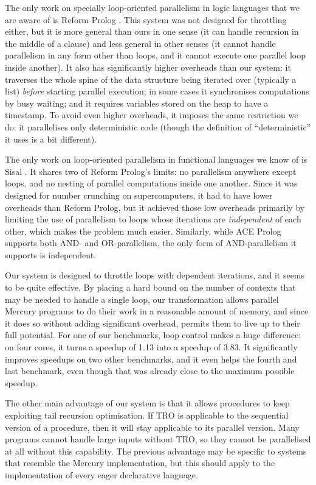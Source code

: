 The only work on specially loop-oriented parallelism in logic languages
that we are aware of is Reform Prolog \citep{bevemyr:reform}.
This system was not designed for throttling either,
but it is more general than ours in one sense
(it can handle recursion in the middle of a clause)
and less general in other senses
(it cannot handle parallelism in any form other than loops,
and it cannot execute one parallel loop inside another).
It also has significantly higher overheads than our system:
it traverses the whole spine of the data structure being iterated over
(typically a list) \emph{before} starting parallel execution;
in some cases it synchronises computations by busy waiting;
and it requires variables stored on the heap to have a timestamp.
To avoid even higher overheads,
it imposes the same restriction we do:
it parallelises only deterministic code
(though the definition of ``deterministic'' it uses is a bit different).

The only work on loop-oriented parallelism in functional languages
we know of is Sisal \citep{feo:1990:sisal-report}.
It shares two of Reform Prolog's limits:
no parallelism anywhere except loops, and
no nesting of parallel computations inside one another.
Since it was designed for number crunching on supercomputers,
it had to have lower overheads than Reform Prolog,
but it achieved those low overheads
primarily by limiting the use of parallelism
to loops whose iterations are \emph{independent} of each other,
which makes the problem much easier.
Similarly, while ACE Prolog supports both AND- and OR-parallelism,
the only form of AND-parallelism it supports is independent.

Our system is designed to throttle loops with dependent iterations,
and it seems to be quite effective.
By placing a hard bound on the number of contexts
that may be needed to handle a single loop,
our transformation allows parallel Mercury programs
to do their work in a reasonable amount of memory,
and since it does so without adding significant overhead,
permits them to live up to their full potential.
For one of our benchmarks,
loop control makes a huge difference:
on four cores, it turns a speedup of 1.13 into a speedup of 3.83.
It significantly improves speedups on two other benchmarks,
and it even helps the fourth and last benchmark,
even though that was already close to the maximum possible speedup.

The other main advantage of our system
is that it allows procedures to keep exploiting tail recursion optimisation.
If TRO is applicable to the sequential version of a procedure,
then it will stay applicable to its parallel version.
Many programs cannot handle large inputs without TRO,
so they cannot be parallelised at all without this capability.
The previous advantage may be specific
to systems that resemble the Mercury implementation,
but this should apply to the implementation
of every eager declarative language.

